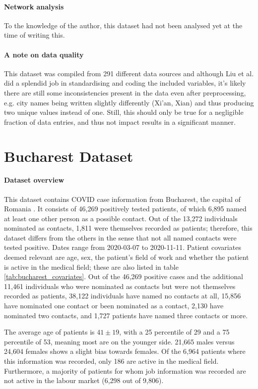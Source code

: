 \paragraph{Network analysis} To the knowledge of the author, this dataset had not been analysed yet at the time of writing this.

\paragraph{A note on data quality} This dataset was compiled from 291 different data sources and although Liu et al. did a splendid job in standardising and coding the included variables, it's likely there are still some inconsistencies present in the data even after preprocessing, e.g. city names being written slightly differently (Xi'an, Xian) and thus producing two unique values instead of one. Still, this should only be true for a negligible fraction of data entries, and thus not impact results in a significant manner.

\section{Bucharest Dataset}
\label{sec:bucharest_dataset}

\paragraph{Dataset overview} This dataset contains COVID case information from Bucharest, the capital of Romania \cite{bucharest_data}. It consists of 46,269 positively tested patients, of which 6,895 named at least one other person as a possible contact. Out of the 13,272 individuals nominated as contacts, 1,811 were themselves recorded as patients; therefore, this dataset differs from the others in the sense that not all named contacts were tested positive. Dates range from 2020-03-07 to 2020-11-11. Patient covariates deemed relevant are age, sex, the patient's field of work and whether the patient is active in the medical field; these are also listed in table \ref{tab:bucharest_covariates}. Out of the 46,269 positive cases and the additional 11,461 individuals who were nominated as contacts but were not themselves recorded as patients, 38,122 individuals have named no contacts at all, 15,856 have nominated one contact or been nominated as a contact, 2,130 have nominated two contacts, and 1,727 patients have named three contacts or more. 

The average age of patients is $41\pm19$, with a 25 percentile of 29 and a 75 percentile of 53, meaning most are on the younger side. 21,665 males versus 24,604 females shows a slight bias towards females. Of the 6,964 patients where this information was recorded, only 186 are active in the medical field. Furthermore, a majority of patients for whom job information was recorded are not active in the labour market (6,298 out of 9,806). 

